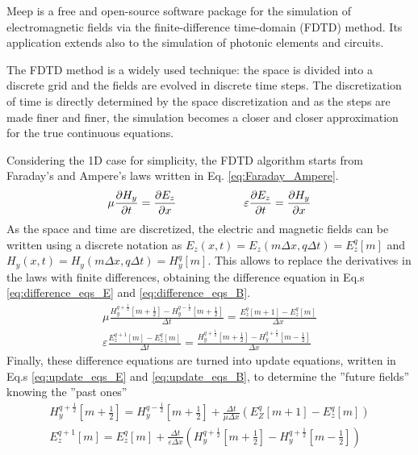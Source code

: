 Meep is a free and open-source software package for the simulation of electromagnetic fields via the finite-difference time-domain (FDTD) method.
Its application extends also to the simulation of photonic elements and circuits.  

The FDTD method is a widely used technique: the space is divided into a discrete grid and the fields are evolved in discrete time steps.
The discretization of time is directly determined by the space discretization and as the steps are made finer and finer, the simulation becomes a closer and closer approximation for the true continuous equations.

Considering the 1D case for simplicity, the FDTD algorithm starts from Faraday's and Ampere's laws written in Eq. \ref*{eq:Faraday_Ampere}.
\begin{equation} \label{eq:Faraday_Ampere}
    \mu \pdv{H_y}{t} = \pdv{E_z}{x} \qquad\qquad\qquad \varepsilon \pdv{E_z}{t} = \pdv{H_y}{x}
\end{equation}
As the space and time are discretized, the electric and magnetic fields can be written using a discrete notation as \(E_z(x, t) = E_z (m\Delta x, q \Delta t) = E_z^q[m]\) and \(H_y(x, t) = H_y(m\Delta x, q \Delta t) = H_y^q[m]\). This allows to replace the derivatives in the laws with finite differences, obtaining the difference equation in Eq.s \ref*{eq:difference_eqs_E} and \ref*{eq:difference_eqs_B}.
\begin{align}
    \label{eq:difference_eqs_E}
    \mu \frac{H_y^{q+\frac{1}{2}}[m+\frac{1}{2}] - H_y^{q-\frac{1}{2}}[m+\frac{1}{2}]}{\Delta t} = \frac{E_z^q[m+1] - E_z^q[m]}{\Delta x}
    \\
    \label{eq:difference_eqs_B}
    \varepsilon\frac{E_z^{q+1}[m] - E_z^q[m]}{\Delta t} = \frac{H_y^{q+\frac{1}{2}}[m+\frac{1}{2}] - H_y^{q+\frac{1}{2}}[m-\frac{1}{2}]}{\Delta x}
\end{align}
Finally, these difference equations are turned into update equations, written in Eq.s \ref*{eq:update_eqs_E} and \ref*{eq:update_eqs_B}, to determine the ''future fields'' knowing the ''past ones''
\begin{align}
    \label{eq:update_eqs_E}
    H_y^{q+\frac{1}{2}} \left[ m+\frac{1}{2} \right] = H_y^{q-\frac{1}{2}} \left[ m+\frac{1}{2} \right] + \frac{\Delta t}{\mu \Delta x} \left( E_Z^q[m+1] - E_z^q[m] \right)
    \\
    \label{eq:update_eqs_B}
    E_z^{q+1} [m] = E_z^q[m] + \frac{\Delta t}{\varepsilon \Delta x} \left( H_y^{q+\frac{1}{2}}\left[ m+\frac{1}{2} \right] - H_y^{q+\frac{1}{2}}\left[ m-\frac{1}{2} \right] \right)
\end{align}

